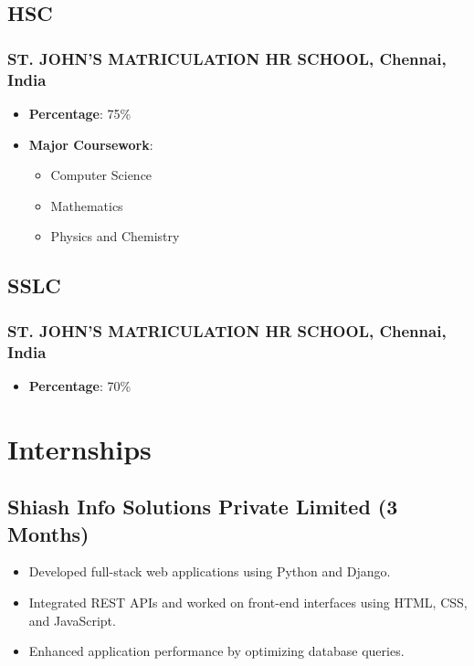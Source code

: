 \documentclass[11pt]{article}
\begin{document}
\subsection{HSC \hfill {}}  
\subsubsection{ST. JOHN'S MATRICULATION HR SCHOOL, Chennai, India}
\begin{itemize}
    \item \textbf{Percentage}: 75\%
    \item \textbf{Major Coursework}: 
    \begin{itemize}
        \item Computer Science
        \item Mathematics
        \item Physics and Chemistry
    \end{itemize}
\end{itemize}

\subsection{SSLC \hfill {}}  
\subsubsection{ST. JOHN'S MATRICULATION HR SCHOOL, Chennai, India}
\begin{itemize}
    \item \textbf{Percentage}: 70\%
\end{itemize}

\section{Internships}
\subsection{Shiash Info Solutions Private Limited (3 Months)} 
\begin{itemize}
    \item Developed full-stack web applications using Python and Django.
    \item Integrated REST APIs and worked on front-end interfaces using HTML, CSS, and JavaScript.
    \item Enhanced application performance by optimizing database queries.
\end{itemize}
\end{document}
